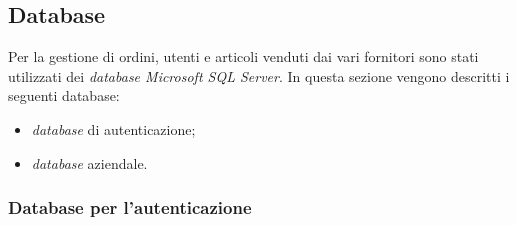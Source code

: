 \documentclass[12pt, a4paper, titlepage]{report}
\begin{document}
	\subsection{Database}
	
	Per la gestione di ordini, utenti e articoli venduti dai vari fornitori sono stati utilizzati dei \textit{database Microsoft SQL Server}. In questa sezione vengono descritti i seguenti database:
	\begin{itemize}
		\item \textit{database} di autenticazione;
		\item \textit{database} aziendale.
	\end{itemize}
	
	\subsubsection{Database per l'autenticazione}
	
\end{document}
